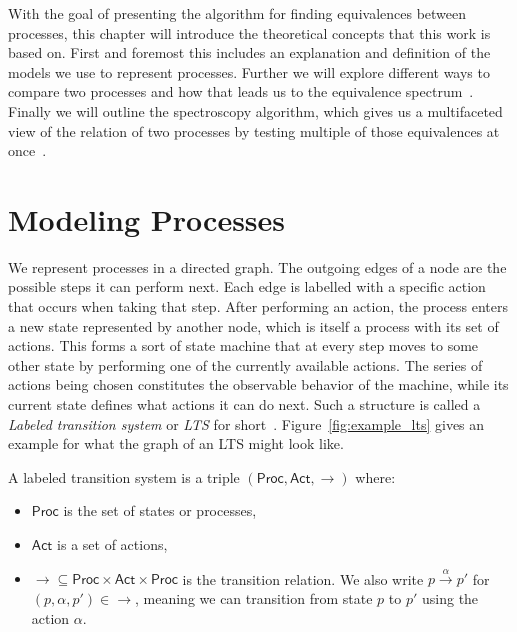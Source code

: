 With the goal of presenting the algorithm for finding equivalences between
processes,
this chapter will introduce the theoretical concepts that this work is based on.
First and foremost this includes an explanation and definition
of the models we use to represent processes.
Further we will explore different ways to compare two processes and how that
leads us to the equivalence spectrum~\cite{glabbeek1990spectrum}.
Finally we will outline the spectroscopy algorithm,
which gives us a multifaceted view of the relation of two processes by testing
multiple of those equivalences at once~\cite{bisping2023process}.


\section{Modeling Processes}

We represent processes in a directed graph.
The outgoing edges of a node are the possible steps it can perform next.
Each edge is labelled with a specific action that occurs when taking that step.
After performing an action,
the process enters a new state represented by another node,
which is itself a process with its set of actions.
This forms a sort of state machine that at every step
moves to some other state by performing one of the currently available actions.
The series of actions being chosen
constitutes the observable behavior of the machine,
while its current state defines what actions it can do next.
Such a structure is called a \emph{Labeled transition system}
or \emph{LTS} for short~\cite{reactive_systems}.
Figure~\ref{fig:example_lts} gives an example for what the graph of an LTS might
look like.

\begin{definition}
    A labeled transition system is a triple
    $(\mathsf{Proc}, \mathsf{Act}, {\rightarrow})$
    where:

    \begin{itemize}
        \item $\mathsf{Proc}$ is the set of states or processes,
        \item $\mathsf{Act}$ is a set of actions,
        \item ${\rightarrow} \subseteq \mathsf{Proc} \times \mathsf{Act} \times \mathsf{Proc}$
            is the transition relation.
            We also write
            $p \xrightarrow{\alpha} p'$ for $(p, \alpha, p') \in {\rightarrow}$,
            meaning we can transition from state $p$ to $p'$
            using the action $\alpha$.
    \end{itemize}
\end{definition}

